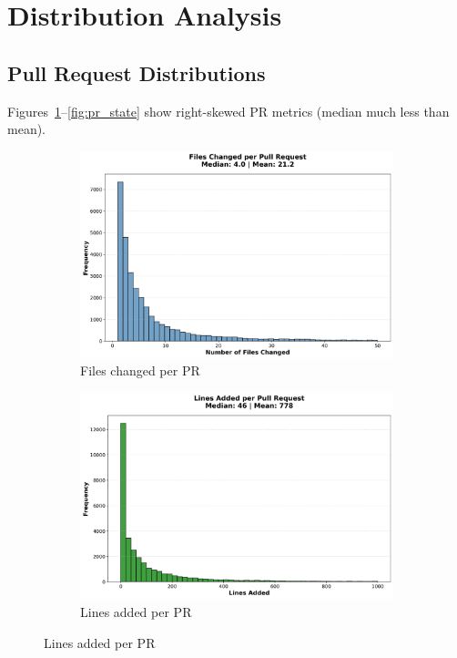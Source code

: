 \documentclass[11pt]{article}
\begin{document}
\section{Distribution Analysis}

\subsection{Pull Request Distributions}

Figures~\ref{fig:pr_files}--\ref{fig:pr_state} show right-skewed PR metrics (median much less than mean).

\begin{figure}[H]
\centering
\begin{subfigure}[b]{0.48\textwidth}
\centering
\includegraphics[width=\textwidth]{figures_individual/01_pr_files_changed_histogram.png}
\caption{Files changed per PR}
\label{fig:pr_files}
\end{subfigure}
\hfill
\begin{subfigure}[b]{0.48\textwidth}
\centering
\includegraphics[width=\textwidth]{figures_individual/04_pr_lines_added_histogram.png}
\caption{Lines added per PR}
\label{fig:pr_added}
\end{subfigure}


\end{figure}
\end{document}
